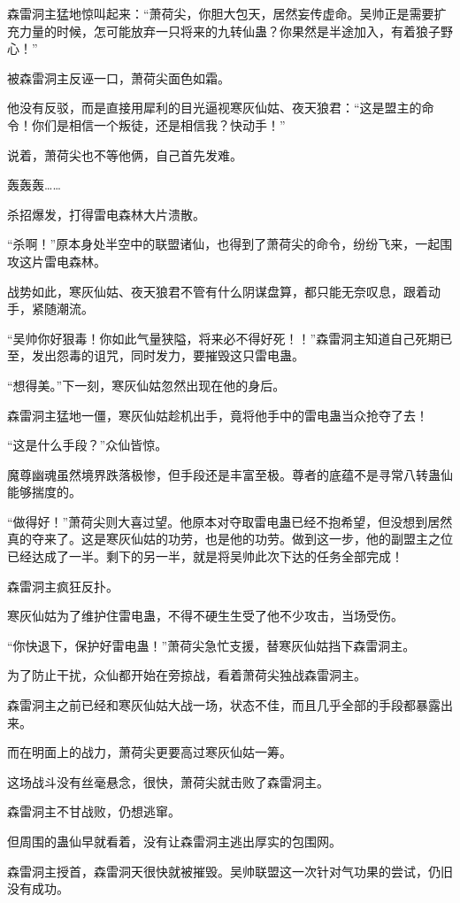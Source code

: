 \begin{this_body}
森雷洞主猛地惊叫起来：“萧荷尖，你胆大包天，居然妄传虚命。吴帅正是需要扩充力量的时候，怎可能放弃一只将来的九转仙蛊？你果然是半途加入，有着狼子野心！”

被森雷洞主反诬一口，萧荷尖面色如霜。

他没有反驳，而是直接用犀利的目光逼视寒灰仙姑、夜天狼君：“这是盟主的命令！你们是相信一个叛徒，还是相信我？快动手！”

说着，萧荷尖也不等他俩，自己首先发难。

轰轰轰……

杀招爆发，打得雷电森林大片溃散。

“杀啊！”原本身处半空中的联盟诸仙，也得到了萧荷尖的命令，纷纷飞来，一起围攻这片雷电森林。

战势如此，寒灰仙姑、夜天狼君不管有什么阴谋盘算，都只能无奈叹息，跟着动手，紧随潮流。

“吴帅你好狠毒！你如此气量狭隘，将来必不得好死！！”森雷洞主知道自己死期已至，发出怨毒的诅咒，同时发力，要摧毁这只雷电蛊。

“想得美。”下一刻，寒灰仙姑忽然出现在他的身后。

森雷洞主猛地一僵，寒灰仙姑趁机出手，竟将他手中的雷电蛊当众抢夺了去！

“这是什么手段？”众仙皆惊。

魔尊幽魂虽然境界跌落极惨，但手段还是丰富至极。尊者的底蕴不是寻常八转蛊仙能够揣度的。

“做得好！”萧荷尖则大喜过望。他原本对夺取雷电蛊已经不抱希望，但没想到居然真的夺来了。这是寒灰仙姑的功劳，也是他的功劳。做到这一步，他的副盟主之位已经达成了一半。剩下的另一半，就是将吴帅此次下达的任务全部完成！

森雷洞主疯狂反扑。

寒灰仙姑为了维护住雷电蛊，不得不硬生生受了他不少攻击，当场受伤。

“你快退下，保护好雷电蛊！”萧荷尖急忙支援，替寒灰仙姑挡下森雷洞主。

为了防止干扰，众仙都开始在旁掠战，看着萧荷尖独战森雷洞主。

森雷洞主之前已经和寒灰仙姑大战一场，状态不佳，而且几乎全部的手段都暴露出来。

而在明面上的战力，萧荷尖更要高过寒灰仙姑一筹。

这场战斗没有丝毫悬念，很快，萧荷尖就击败了森雷洞主。

森雷洞主不甘战败，仍想逃窜。

但周围的蛊仙早就看着，没有让森雷洞主逃出厚实的包围网。

森雷洞主授首，森雷洞天很快就被摧毁。吴帅联盟这一次针对气功果的尝试，仍旧没有成功。


\end{this_body}
